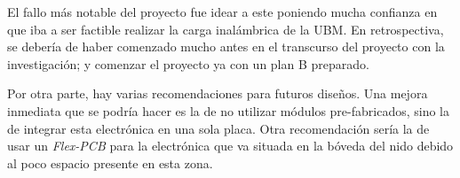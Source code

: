 El fallo más notable del proyecto fue idear a este poniendo mucha confianza en que iba a ser factible realizar la carga inalámbrica de la UBM. En retrospectiva, se debería de haber comenzado mucho antes en el transcurso del proyecto con la investigación; y comenzar el proyecto ya con un plan B preparado.

Por otra parte, hay varias recomendaciones para futuros diseños. Una mejora inmediata que se podría hacer es la de no utilizar módulos pre-fabricados, sino la de integrar esta electrónica en una sola placa. Otra recomendación sería la de usar un \textit{Flex-PCB} para la electrónica que va situada en la bóveda del nido debido al poco espacio presente en esta zona.